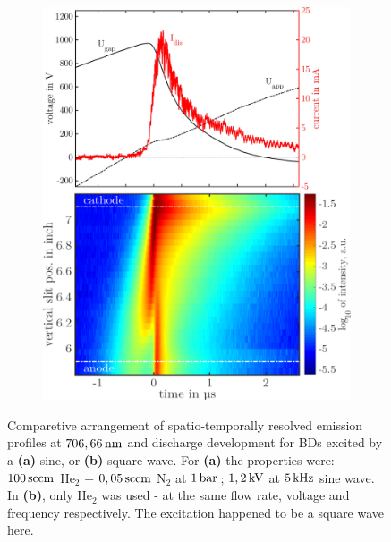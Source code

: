 \documentclass[a4paper,10pt,twoside]{article}
\newcommand{\fett}[1]{\textbf{#1}}
\begin{document}
\begin{figure}
\begin{subfigure}[t]{0.49\textwidth}
						\includegraphics[width=\textwidth]{figures/706nm@square/combination.pdf}
						\caption{}
						\label{img:combsquare}
					\end{subfigure}
					\caption{Comparetive arrangement of spatio-temporally resolved emission profiles at $\unit[706,66]{nm}$ and discharge development for BDs excited by a \fett{(a)} sine, or \fett{(b)} square wave. For \fett{(a)} the properties were: $\unit[100]{sccm}$ He$_2$ + $\unit[0,05]{sccm}$ N$_2$ at $\unit[1]{bar}$\,; $\unit[1,2]{kV}$ at $\unit[5]{kHz}$ sine wave. In \fett{(b)}, only He$_2$ was used - at the same flow rate, voltage and frequency respectively. The excitation happened to be a square wave here.}
					\label{img:comparisonsinesquare}
				\end{figure}
				
\end{document}
